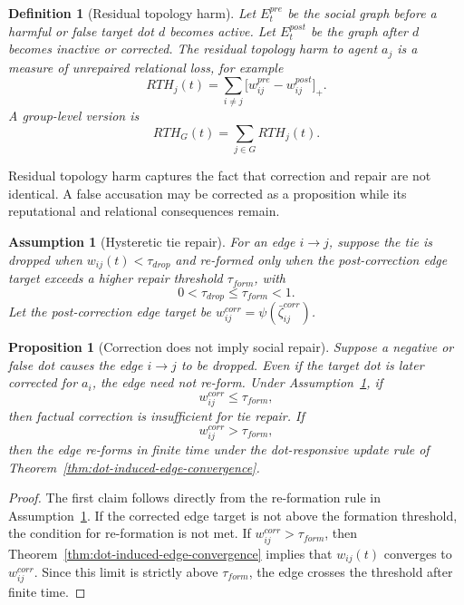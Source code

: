 \documentclass[11pt]{article}
\newtheorem{definition}{Definition}
\newtheorem{assumption}{Assumption}
\newtheorem{proposition}{Proposition}
\theoremstyle{remark}
\begin{document}
\begin{definition}[Residual topology harm]\label{def:residual-topology-harm}
Let $E_t^{pre}$ be the social graph before a harmful or false target dot
$d$ becomes active. Let $E_t^{post}$ be the graph after $d$ becomes
inactive or corrected. The residual topology harm to agent $a_j$ is a
measure of unrepaired relational loss, for example
$$
RTH_j(t)=\sum_{i\neq j}\big[w_{ij}^{pre}-w_{ij}^{post}\big]_+.
$$
A group-level version is
$$
RTH_G(t)=\sum_{j\in G}RTH_j(t).
$$
\end{definition}

Residual topology harm captures the fact that correction and repair are
not identical. A false accusation may be corrected as a proposition while
its reputational and relational consequences remain.

\begin{assumption}[Hysteretic tie repair]\label{ass:hysteretic-tie-repair}
For an edge $i\to j$, suppose the tie is dropped when
$w_{ij}(t)<\tau_{drop}$ and re-formed only when the post-correction edge
target exceeds a higher repair threshold $\tau_{form}$, with
$$
0<\tau_{drop}\leq\tau_{form}<1.
$$
Let the post-correction edge target be $w_{ij}^{corr}=\psi(\bar{\zeta}_{ij}^{corr})$.
\end{assumption}

\begin{proposition}[Correction does not imply social repair]\label{prop:correction-not-repair}
Suppose a negative or false dot causes the edge $i\to j$ to be dropped.
Even if the target dot is later corrected for $a_i$, the edge need not
re-form. Under Assumption~\ref{ass:hysteretic-tie-repair}, if
$$
w_{ij}^{corr}\leq\tau_{form},
$$
then factual correction is insufficient for tie repair. If
$$
w_{ij}^{corr}>\tau_{form},
$$
then the edge re-forms in finite time under the dot-responsive update
rule of Theorem~\ref{thm:dot-induced-edge-convergence}.
\end{proposition}

\begin{proof}
The first claim follows directly from the re-formation rule in
Assumption~\ref{ass:hysteretic-tie-repair}. If the corrected edge target
is not above the formation threshold, the condition for re-formation is
not met. If $w_{ij}^{corr}>\tau_{form}$, then
Theorem~\ref{thm:dot-induced-edge-convergence} implies that $w_{ij}(t)$
converges to $w_{ij}^{corr}$. Since this limit is strictly above
$\tau_{form}$, the edge crosses the threshold after finite time.
\end{proof}
\end{document}
